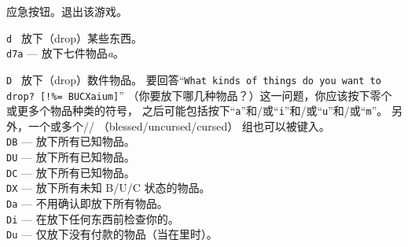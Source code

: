 \documentclass[a4paper, 10pt]{article}
\newcommand{\tb}[1]{\tt #1 \hfill}
\begin{document}
应急按钮。退出该游戏。
\item[\tb{d}]
放下（drop）某些东西。\\
{\tt d7a} --- 放下七件物品{\it a}。
\item[\tb{D}]
放下（drop）数件物品。
要回答“{\tt What kinds of things do you want to drop? [!\%= BUCXaium]}”
（你要放下哪几种物品？）这一问题，你应该按下零个或更多个物品种类的符号，
之后可能包括按下“{\tt a}”和/或“{\tt i}”和/或“{\tt u}”和/或“{\tt m}”。
另外，一个或多个\zhTransBlessed/\zhTransUncursed/\zhTransCursed
（blessed/uncursed/cursed）
组也可以被键入。\\
{\tt DB}  --- 放下所有已知\zhTransBlessed{}物品。\\
{\tt DU}  --- 放下所有已知\zhTransUncursed{}物品。\\
{\tt DC}  --- 放下所有已知\zhTransCursed{}物品。\\
{\tt DX}  --- 放下所有未知 B/U/C 状态的物品。\\
{\tt Da}  --- 不用确认即放下所有物品。\\
{\tt Di}  --- 在放下任何东西前检查你的\zhTransInventory。\\
{\tt Du}  --- 仅放下没有付款的物品（当在\zhTransShop{}里时）。\\
\end{document}
